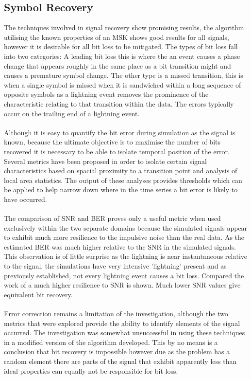 \subsection{Symbol Recovery}
The techniques involved in signal recovery show promising results, the algorithm utilising the known properties of an MSK shows good results for all signals, however it is desirable for all bit loss to be mitigated. The types of bit loss fall into two categories: A leading bit loss this is where the an event causes a phase change that appears roughly in the same place as a bit transition might and causes a premature symbol change. The other type is a missed transition, this is when a single symbol is missed when it is sandwiched within a long sequence of opposite symbols as a lightning event removes the prominence of the characteristic relating to that transition within the data. The errors typically occur on the trailing end of a lightning event.
\\\\
Although it is easy to quantify the bit error during simulation as the signal is known, because the ultimate objective is to maximise the number of bits recovered it is necessary to be able to isolate temporal position of the error. Several metrics have been proposed in order to isolate certain signal characteristics based on spacial proximity to a transition point and analysis of local area statistics. The output of these analyses provides thresholds which can be applied to help narrow down where in the time series a bit error is likely to have occurred.
\\\\
The comparison of SNR and BER proves only a useful metric when used exclusively within the two separate domains because the simulated signals appear to exhibit much more resilience to the impulsive noise than the real data. As the estimated BER was much higher relative to the SNR in the simulated signals. This observation is of little surprise as the lightning is near instantaneous relative to the signal, the simulations have very intensive 'lightning' present and as previously established, not every lightning event causes a bit loss. Compared the work of \cite{Yang2016} a much higher resilience to SNR is shown. Much lower SNR values give equivalent bit recovery.
\\\\
Error correction remains a limitation of the investigation, although the two metrics that were explored provide the ability to identify elements of the signal occurred. The investigation was somewhat unsuccessful in using these techniques in a modified version of the algorithm developed. This by no means is a conclusion that bit recovery is impossible however due as the problem has a random element there are parts of the signal that exhibit apparently less than ideal properties can equally not be responsible for bit loss. 

